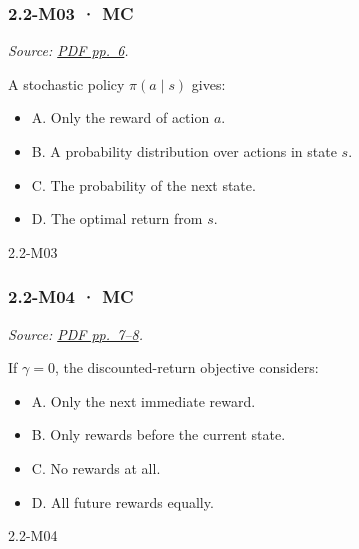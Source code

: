\noindent\begin{minipage}{\linewidth}

\subsubsection{2.2-M03 · MC}\label{m03-mc-4}

\emph{Source:
\href{../Lecture\%20Slides/2.2.\%20Markov\%20decision\%20processes.pdf\#page=6}{PDF
pp.~6}.}

A stochastic policy \(\pi(a\mid s)\) gives:

\begin{itemize}
\tightlist
\item
  A. Only the reward of action \(a\).
\item
  B. A probability distribution over actions in state \(s\).
\item
  C. The probability of the next state.
\item
  D. The optimal return from \(s\).
\end{itemize}

\begin{solution}[8mm]{2.2-M03}

\end{solution}
\end{minipage}\par\medskip

\noindent\begin{minipage}{\linewidth}

\subsubsection{2.2-M04 · MC}\label{m04-mc-4}

\emph{Source:
\href{../Lecture\%20Slides/2.2.\%20Markov\%20decision\%20processes.pdf\#page=7}{PDF
pp.~7--8}.}

If \(\gamma=0\), the discounted-return objective considers:

\begin{itemize}
\tightlist
\item
  A. Only the next immediate reward.
\item
  B. Only rewards before the current state.
\item
  C. No rewards at all.
\item
  D. All future rewards equally.
\end{itemize}

\begin{solution}[8mm]{2.2-M04}

\end{solution}
\end{minipage}\par\medskip

